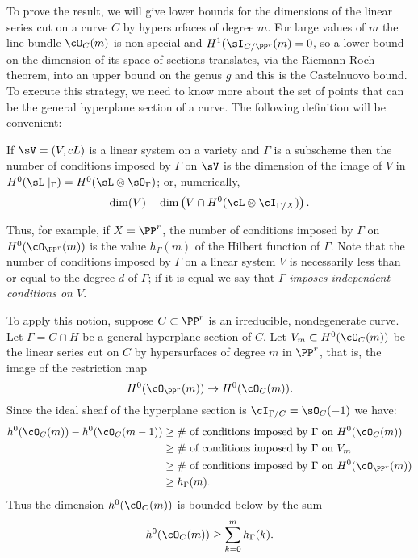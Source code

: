 To prove the result, we will give lower bounds for the dimensions of the linear series  cut on a curve $C$ by hypersurfaces of degree $m$. For large values of $m$ the line bundle $\cO_C(m)$ is non-special and $H^1(\sI_{C/\PP^r}(m) = 0$, so a lower bound on the dimension of its space of sections translates, via the Riemann-Roch theorem, into an upper bound on the genus $g$ and this is the Castelnuovo bound. To execute this strategy, we need to know more about the set of points that can be the general hyperplane section of a curve. The following definition will be convenient:

\begin{definition}
If $\sV = (V,cL)$ is a linear system on a variety and $\Gamma$ is a subscheme then the number of conditions
imposed by $\Gamma$ on $\sV$ is the dimension of the image of $V$ in $H^0(\sL\mid_\Gamma) = H^0(\sL \otimes \sO_\Gamma)$; or, numerically,
$$
\dim(V) - \dim \left(V \cap H^0(\cL\otimes \cI_{\Gamma/X}) \right).
$$\end{definition}

Thus, for example, if $X = \PP^r$, the number of conditions imposed by $\Gamma$ on $H^0(\cO_{\PP^r}(m))$ is the value $h_\Gamma(m)$ of the Hilbert function of $\Gamma$.
Note that the number of conditions imposed by $\Gamma$ on a linear system $V$ is necessarily less than or equal to the degree $d$ of $\Gamma$; if it is equal we say that $\Gamma$ \emph{imposes independent conditions on $V$}.

To apply this notion, suppose $C \subset \PP^r$ is an irreducible, nondegenerate curve. Let $\Gamma = C \cap H$ be a general hyperplane section of $C$. Let $V_m \subset H^0(\cO_C(m))$ be the linear series cut on $C$ by hypersurfaces of degree $m$ in $\PP^r$, that is, the image of the restriction map
$$
H^0(\cO_{\PP^r}(m)) \to H^0(\cO_C(m)).
$$
Since the ideal sheaf of the hyperplane section is $\cI_{\Gamma/C} = \sO_C(-1)$ we have:
\begin{align*}
h^0(\cO_C(m)) - h^0(\cO_C(m-1)) & \geq \text{\# of conditions imposed by $\Gamma$ on $H^0(\cO_C(m))$} \\
&\geq \text{\# of conditions imposed by $\Gamma$ on $V_m$} \\
&\geq \text{\# of conditions imposed by $\Gamma$ on $H^0(\cO_{\PP^r}(m))$} \\
&\geq h_\Gamma(m).
\end{align*}
Thus the dimension $h^0(\cO_C(m))$ is bounded below by the sum
$$
h^0(\cO_C(m)) \geq \sum_{k=0}^m h_\Gamma(k).
$$

